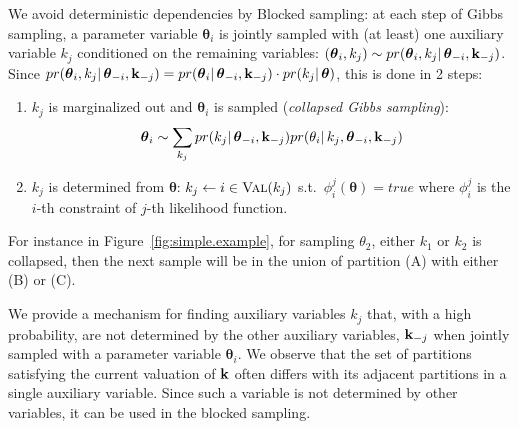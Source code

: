 We avoid deterministic dependencies by Blocked sampling:
at each step of Gibbs sampling, a parameter variable $\boldsymbol\theta_i$ is 
jointly sampled with  
(at least) one auxiliary variable $k_j$ 
conditioned on the remaining variables:
$
(\boldsymbol\theta_i, k_j) \sim pr(\boldsymbol\theta_i, k_j | \, \boldsymbol 
\theta_{-i}, 
\textbf{k}_{-j})  
$.
Since 
$pr(\boldsymbol\theta_i, k_j | \, \boldsymbol \theta_{-i}, \textbf{k}_{-j}) = 
pr(\boldsymbol\theta_i | \, \boldsymbol \theta_{-i}, \textbf{k}_{-j})\cdot pr(k_j 
| \, \boldsymbol\theta)$,  
this is done in 2 steps:
\begin{enumerate}
\item 
$k_j$ is marginalized out and $\boldsymbol\theta_i$ is sampled (\emph{collapsed 
Gibbs sampling}):
$$
\boldsymbol\theta_i \sim \sum_{k_j} 
pr(k_j | \, \boldsymbol \theta_{-i}, \textbf{k}_{-j}) 
pr(\theta_i | \, k_j, \boldsymbol \theta_{-i}, \textbf{k}_{-j})  
$$
\item
$k_j$ is determined from $\boldsymbol \theta$:
$k_j \leftarrow i \in \textsc{Val}(k_j)$ s.t.\ $\phi_i^j(\boldsymbol \theta) = \textit{true}$
where $\phi_i^j$ is the $i$-th constraint of $j$-th likelihood function.
\end{enumerate}

For instance in Figure~\ref{fig:simple.example}, for sampling $\theta_2$, 
either $k_1$ or $k_2$ is collapsed,
then the next sample will be in the union of partition (A) with either (B) or (C). 

We provide a mechanism for finding auxiliary variables $k_j$ that, with a high  
probability, are not determined by the other auxiliary variables, 
$\textbf{k}_{-j}$ when jointly sampled with a parameter variable 
$\boldsymbol\theta_i$. 
We observe that the set of partitions satisfying the current valuation of $\textbf{k}$
often differs with its adjacent partitions in a single auxiliary variable.
Since such a variable is not determined by other variables, it can be used in 
the blocked sampling.

